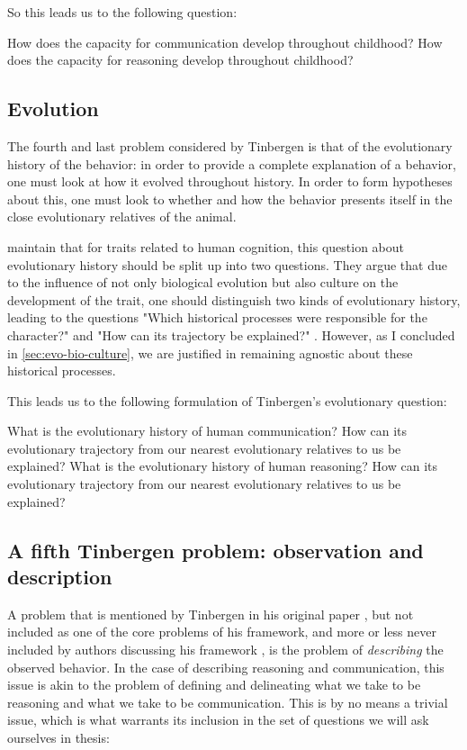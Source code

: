 So this leads us to the following question:
\begin{exe}
    \ex
    \begin{xlist}
        \ex How does the capacity for communication develop throughout childhood?
        \ex How does the capacity for reasoning develop throughout childhood?
    \end{xlist}
\end{exe}

\subsection{Evolution}
The fourth and last problem considered by Tinbergen is that of the evolutionary history of the behavior: in order to provide a complete explanation of a behavior, one must look at how it evolved throughout history. In order to form hypotheses about this, one must look to whether and how the behavior presents itself in the close evolutionary relatives of the animal.

\citet{BatesonLaland13} maintain that for traits related to human cognition, this question about evolutionary history should be split up into two questions. They argue that due to the influence of not only biological evolution but also culture on the development of the trait, one should distinguish two kinds of evolutionary history, leading to the questions "Which historical processes were responsible for the character?" and "How can its trajectory be explained?" \citep[p.~714]{BatesonLaland13}. However, as I concluded in \cref{sec:evo-bio-culture}, we are justified in remaining agnostic about these historical processes.

This leads us to the following formulation of Tinbergen's evolutionary question:

\begin{exe}
    \ex
    \begin{xlist}
        \ex What is the evolutionary history of human communication? How can its evolutionary trajectory from our nearest evolutionary relatives to us be explained?
        \ex What is the evolutionary history of human reasoning? How can its evolutionary trajectory from our nearest evolutionary relatives to us be explained?
    \end{xlist}
\end{exe}

\subsection{A fifth Tinbergen problem: observation and description}
A problem that is mentioned by Tinbergen in his original paper \citeyear{Tinbergen63}, but not included as one of the core problems of his framework, and more or less never included by authors discussing his framework \citep{LB02, Laland13, AllenBekoff95}, is the problem of \emph{describing} the observed behavior.
In the case of describing reasoning and communication, this issue is akin to the problem of defining and delineating what we take to be reasoning and what we take to be communication. This is by no means a trivial issue, which is what warrants its inclusion in the set of questions we will ask ourselves in thesis:

